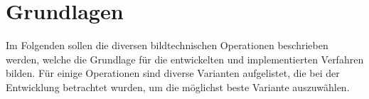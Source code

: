 \chapter{Grundlagen}
\writtenby{\dcauthornameewie}%
Im Folgenden sollen die diversen bildtechnischen Operationen beschrieben werden, welche die Grundlage für die entwickelten und implementierten Verfahren bilden.
Für einige Operationen sind diverse Varianten aufgelistet, die bei der Entwicklung betrachtet wurden, um die möglichst beste Variante auszuwählen.









